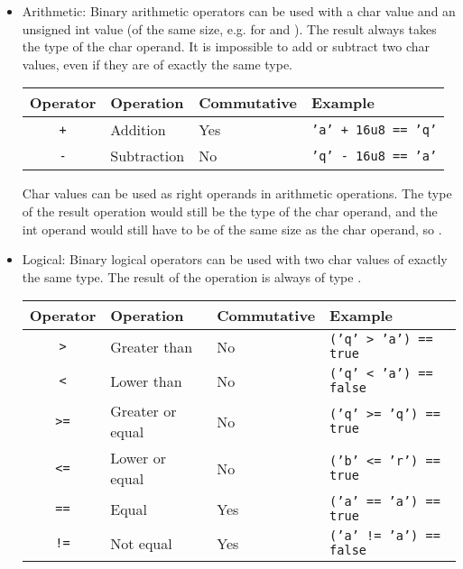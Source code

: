 \begin{itemize}
\item Arithmetic: Binary arithmetic operators can be used with a char value and
  an unsigned int value (of the same size, e.g. for  and
  ). The result always takes the type of the char operand. It is
  impossible to add or subtract two char values, even if they are of exactly the
  same type.

  \begin{center}
    \vspace{-5pt}\begin{adjustbox}{max width=1.0\linewidth}
      \begin{tabular}{|c|lll|}
        \hline
        Operator & Operation & Commutative & Example\\[0pt]
        \hline
        \hline
        \texttt{+} & Addition & Yes & \texttt{'a' + 16u8 == 'q'}\\[0pt]
        \texttt{-} & Subtraction & No & \texttt{'q' - 16u8 == 'a'}\\[0pt]
        \hline
      \end{tabular}
  \end{adjustbox}\end{center}


  Char values can be used as right operands in arithmetic operations. The type of
  the result operation would still be the type of the char operand, and the int
  operand would still have to be of the same size as the char operand, so
  .

\item Logical: Binary logical operators can be used with two char values of
  exactly the same type. The result of the operation is always of type
  .

  \begin{center}
    \vspace{-10pt}\begin{adjustbox}{max width=1.0\linewidth}
      \begin{tabular}{|c|lll|}
        \hline
        Operator & Operation & Commutative & Example\\[0pt]
        \hline
        \hline
        \texttt{>} & Greater than & No & \texttt{('q' > 'a') == true}\\[0pt]
        \texttt{<} & Lower than & No & \texttt{('q' < 'a') == false}\\[0pt]
        \texttt{>=} & Greater or equal & No & \texttt{('q' >= 'q') == true}\\[0pt]
        \texttt{<=} & Lower or equal & No & \texttt{('b' <= 'r') == true}\\[0pt]
        \texttt{==} & Equal & Yes & \texttt{('a' == 'a') == true}\\[0pt]
        \texttt{!=} & Not equal & Yes & \texttt{('a' != 'a') == false}\\[0pt]
        \hline
      \end{tabular}
  \end{adjustbox}\end{center}


\end{itemize}
